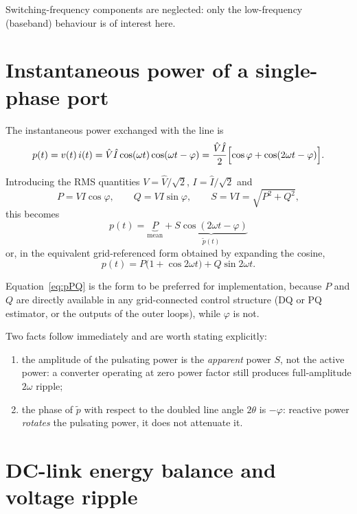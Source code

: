 \documentclass[11pt,a4paper]{article}
\begin{document}
Switching-frequency components are neglected: only the low-frequency (baseband)
behaviour is of interest here.

\section{Instantaneous power of a single-phase port}

The instantaneous power exchanged with the line is
\begin{equation}
  p(t) = v(t)\, i(t)
       = \hat V \hat I \cos(\omega t)\cos(\omega t - \varphi)
       = \frac{\hat V \hat I}{2}\Bigl[\cos\varphi + \cos(2\omega t - \varphi)\Bigr].
\end{equation}

Introducing the RMS quantities $V=\hat V/\sqrt 2$, $I=\hat I/\sqrt 2$ and
\begin{equation}
  P = VI\cos\varphi, \qquad
  Q = VI\sin\varphi, \qquad
  S = VI = \sqrt{P^2+Q^2},
\end{equation}
this becomes
\begin{equation}
  \boxed{\;
  p(t) = \underbrace{P}_{\text{mean}}
       + \underbrace{S\cos(2\omega t - \varphi)}_{\tilde p(t)} \;}
  \label{eq:p}
\end{equation}
or, in the equivalent grid-referenced form obtained by expanding the cosine,
\begin{equation}
  p(t) = P\bigl(1 + \cos 2\omega t\bigr) + Q \sin 2\omega t .
  \label{eq:pPQ}
\end{equation}

Equation~\eqref{eq:pPQ} is the form to be preferred for implementation, because
$P$ and $Q$ are directly available in any grid-connected control structure
(DQ or PQ estimator, or the outputs of the outer loops), while $\varphi$ is not.

Two facts follow immediately and are worth stating explicitly:
\begin{enumerate}
  \item the amplitude of the pulsating power is the \emph{apparent} power $S$,
        not the active power: a converter operating at zero power factor still
        produces full-amplitude $2\omega$ ripple;
  \item the phase of $\tilde p$ with respect to the doubled line angle $2\theta$
        is $-\varphi$: reactive power \emph{rotates} the pulsating power, it does
        not attenuate it.
\end{enumerate}

\section{DC-link energy balance and voltage ripple}
\end{document}
